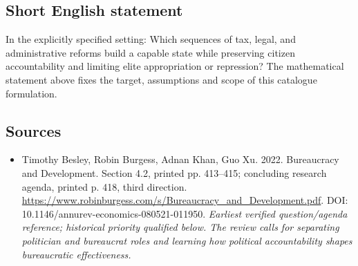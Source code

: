 \documentclass[11pt]{article}
\begin{document}
\subsection{Short English statement}
In the explicitly specified setting: Which sequences of tax, legal, and administrative reforms build a capable state while preserving citizen accountability and limiting elite appropriation or repression? The mathematical statement above fixes the target, assumptions and scope of this catalogue formulation.

\subsection{Sources}
\begin{itemize}\raggedright
\item[\textnormal{[S1]}]\hypertarget{source:30007663:1}{} Timothy Besley, Robin Burgess, Adnan Khan, Guo Xu. 2022. Bureaucracy and Development. Section 4.2, printed pp. 413–415; concluding research agenda, printed p. 418, third direction.
\url{https://www.robinburgess.com/s/Bureaucracy_and_Development.pdf}.
DOI: 10.1146/annurev-economics-080521-011950.
{\small\textit{Earliest verified question/agenda reference; historical priority qualified below. The review calls for separating politician and bureaucrat roles and learning how political accountability shapes bureaucratic effectiveness.}}
\end{itemize}
\end{document}

